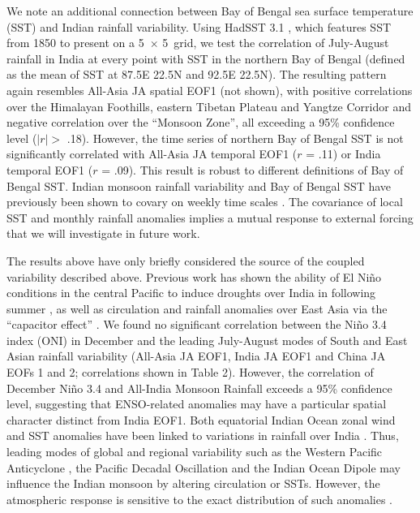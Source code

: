 	We note an additional connection between Bay of Bengal sea surface temperature (SST) and Indian rainfall variability. Using HadSST 3.1 \citep{Kennedy2011a,Kennedy2011}, which features SST from 1850 to present on a 5\textdegree\ $\times$ 5\textdegree\ grid, we test the correlation of July-August rainfall in India at every point with SST in the northern Bay of Bengal (defined as the mean of SST at 87.5\textdegree E 22.5\textdegree N and 92.5\textdegree E 22.5\textdegree N). The resulting pattern again resembles All-Asia JA spatial EOF1 (not shown), with positive correlations over the Himalayan Foothills, eastern Tibetan Plateau and Yangtze Corridor and negative correlation over the ``Monsoon Zone'', all exceeding a 95\% confidence level ($\lvert r \rvert >$ .18). However, the time series of northern Bay of Bengal SST is not significantly correlated with All-Asia JA temporal EOF1 ($r$ = .11) or India temporal EOF1 ($r$ = .09). This result is robust to different definitions of Bay of Bengal SST. Indian monsoon rainfall variability and Bay of Bengal SST have previously been shown to covary on weekly time scales \citep{Vecchi2002,Han2006}. The covariance of local SST and monthly rainfall anomalies implies a mutual response to external forcing that we will investigate in future work.
	
	The results above have only briefly considered the source of the coupled variability described above. Previous work has shown the ability of El Ni\~no conditions in the central Pacific to induce droughts over India in following summer \citep{Kumar2006}, as well as circulation and rainfall anomalies over East Asia via the ``capacitor effect'' \citep{Xie2009}. We found no significant correlation between the Ni\~no 3.4 index (ONI) in December and the leading July-August modes of South and East Asian rainfall variability (All-Asia JA EOF1, India JA EOF1 and China JA EOFs 1 and 2; correlations shown in Table 2). However, the correlation of December Ni\~no 3.4 and All-India Monsoon Rainfall exceeds a 95\% confidence level, suggesting that ENSO-related anomalies may have a particular spatial character distinct from India EOF1. Both equatorial Indian Ocean zonal wind and SST anomalies have been linked to variations in rainfall over India \citep{Ihara2007,Mishra2012}. Thus, leading modes of global and regional variability such as the Western Pacific Anticyclone \citep{Kosaka2011}, the Pacific Decadal Oscillation \citep{Mantua2002} and the Indian Ocean Dipole \citep{Saji1999} may influence the Indian monsoon by altering circulation or SSTs. However, the atmospheric response is sensitive to the exact distribution of such anomalies \citep{Xie2009}.
	
